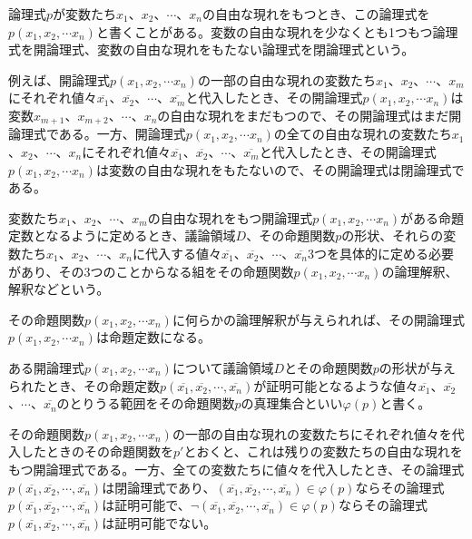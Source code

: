 \documentclass[a4paper]{jsarticle}
\begin{document}
\begin{dfn}
論理式$p$が変数たち$x_{1}$、$x_{2}$、$\cdots$、$x_{n}$の自由な現れをもつとき、この論理式を$p\left( x_{1},x_{2},\cdots x_{n} \right)$と書くことがある。変数の自由な現れを少なくとも1つもつ論理式を開論理式、変数の自由な現れをもたない論理式を閉論理式という。
\end{dfn}
例えば、開論理式$p\left( x_{1},x_{2},\cdots x_{n} \right)$の一部の自由な現れの変数たち$x_{1}$、$x_{2}$、$\cdots$、$x_{m}$にそれぞれ値々$\overline{x_{1}}$、$\overline{x_{2}}$、$\cdots$、$\overline{x_{m}}$と代入したとき、その開論理式$p\left( x_{1},x_{2},\cdots x_{n} \right)$は変数$x_{m + 1}$、$x_{m + 2}$、$\cdots$、$x_{n}$の自由な現れをまだもつので、その開論理式はまだ開論理式である。一方、開論理式$p\left( x_{1},x_{2},\cdots x_{n} \right)$の全ての自由な現れの変数たち$x_{1}$、$x_{2}$、$\cdots$、$x_{n}$にそれぞれ値々$\overline{x_{1}}$、$\overline{x_{2}}$、$\cdots$、$\overline{x_{m}}$と代入したとき、その開論理式$p\left( x_{1},x_{2},\cdots x_{n} \right)$は変数の自由な現れをもたないので、その開論理式は閉論理式である。
\begin{dfn}
変数たち$x_{1}$、$x_{2}$、$\cdots$、$x_{m}$の自由な現れをもつ開論理式$p\left( x_{1},x_{2},\cdots x_{n} \right)$がある命題定数となるように定めるとき、議論領域$D$、その命題関数$p$の形状、それらの変数たち$x_{1}$、$x_{2}$、$\cdots$、$x_{n}$に代入する値々$\overline{x_{1}}$、$\overline{x_{2}}$、$\cdots$、$\overline{x_{n}}$3つを具体的に定める必要があり、その3つのことからなる組をその命題関数$p\left( x_{1},x_{2},\cdots x_{n} \right)$の論理解釈、解釈などという。
\end{dfn}
その命題関数$p\left( x_{1},x_{2},\cdots x_{n} \right)$に何らかの論理解釈が与えられれば、その開論理式$p\left( x_{1},x_{2},\cdots x_{n} \right)$は命題定数になる。
\begin{dfn}
ある開論理式$p\left( x_{1},x_{2},\cdots x_{n} \right)$について議論領域$D$とその命題関数$p$の形状が与えられたとき、その命題定数$p\left( \overline{x_{1}},\overline{x_{2}},\cdots,\overline{x_{n}} \right)$が証明可能となるような値々$\overline{x_{1}}$、$\overline{x_{2}}$、$\cdots$、$\overline{x_{n}}$のとりうる範囲をその命題関数$p$の真理集合といい$\varphi(p)$と書く。
\end{dfn}
その命題関数$p\left( x_{1},x_{2},\cdots x_{n} \right)$の一部の自由な現れの変数たちにそれぞれ値々を代入したときのその命題関数を$p'$とおくと、これは残りの変数たちの自由な現れをもつ開論理式である。一方、全ての変数たちに値々を代入したとき、その論理式$p\left( \overline{x_{1}},\overline{x_{2}},\cdots,\overline{x_{n}} \right)$は閉論理式であり、$\left( \overline{x_{1}},\overline{x_{2}},\cdots,\overline{x_{n}} \right) \in \varphi(p)$ならその論理式$p\left( \overline{x_{1}},\overline{x_{2}},\cdots,\overline{x_{n}} \right)$は証明可能で、$\neg\left( \overline{x_{1}},\overline{x_{2}},\cdots,\overline{x_{n}} \right) \in \varphi(p)$ならその論理式$p\left( \overline{x_{1}},\overline{x_{2}},\cdots,\overline{x_{n}} \right)$は証明可能でない。\par
\end{document}
